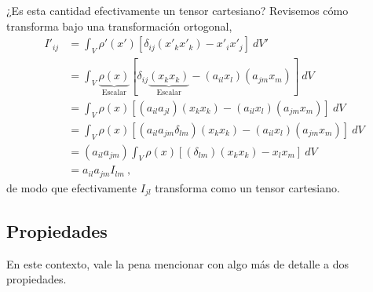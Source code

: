 \begin{ejemplo}
    ¿Es esta cantidad efectivamente un tensor cartesiano? Revisemos cómo transforma bajo una transformación ortogonal,
    \begin{align*}
        I'_{ij} & = \int_V \rho'(x') [\delta_{ij} (x'_k x'_k) - x'_i x'_j] \ dV' \\
        & = \int_V \underbrace{\rho(x)}_{\text{Escalar}} [\delta_{ij}\underbrace{(x_k x_k)}_\text{Escalar} - (a_{il} x_l)(a_{jm} x_m)] \ dV \\
        & = \int_V \rho(x) [(a_{il}a_{jl})(x_k x_k) - (a_{il} x_l)(a_{jm} x_m)] \ dV \\
        & = \int_V \rho(x) [(a_{il}a_{jm}\delta_{lm})(x_k x_k) - (a_{il} x_l)(a_{jm} x_m)] \ dV \\
        & = (a_{il} a_{jm}) \int_V \rho(x) [(\delta_{lm})(x_k x_k) - x_l x_m] \ dV \\
        & = a_{il} a_{jm} I_{lm} \ ,
    \end{align*}
    de modo que efectivamente $I_{jl}$ transforma como un tensor cartesiano.
\end{ejemplo}

\subsection{Propiedades}

En este contexto, vale la pena mencionar con algo más de detalle a dos propiedades.

